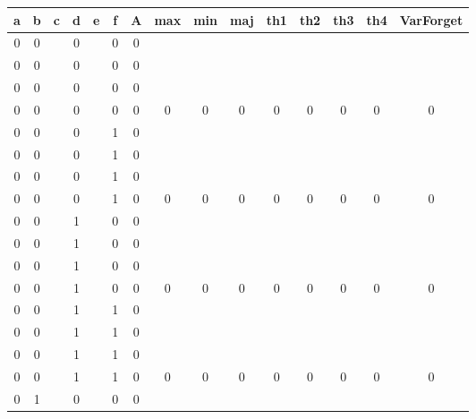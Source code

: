 \begin{table}[!tb]
    \centering
    \begin{tabular}{|c|c|c|c|c|c|c|c|c|c|c|c|c|c|c|}
        \hline
        \textbf{a} & \textbf{b} & \textbf{c} & \textbf{d} & \textbf{e} & \textbf{f} & \textbf{A} & \textbf{max} & \textbf{min} & \textbf{maj} & \textbf{th1} & \textbf{th2} & \textbf{th3} & \textbf{th4} & \textbf{VarForget} \\ \hline
        \rowcolor{gray!40} 0 & 0 &  & 0 &  & 0 & 0 &  &  &  &  &  &  &  &  \\ \hline
        \rowcolor{gray!40} 0 & 0 &  & 0 &  & 0 & 0 &  &  &  &  &  &  &  &  \\ \hline
        \rowcolor{gray!40} 0 & 0 &  & 0 &  & 0 & 0 &  &  &  &  &  &  &  &  \\ \hline
        \rowcolor{gray!40} 0 & 0 &  & 0 &  & 0 & 0 & 0 & 0 & 0 & 0 & 0 & 0 & 0 & 0 \\ \hline
        \rowcolor{blue!40} 0 & 0 &  & 0 &  & 1 & 0 &  &  &  &  &  &  &  &  \\ \hline
        \rowcolor{blue!40} 0 & 0 &  & 0 &  & 1 & 0 &  &  &  &  &  &  &  &  \\ \hline
        \rowcolor{blue!40} 0 & 0 &  & 0 &  & 1 & 0 &  &  &  &  &  &  &  &  \\ \hline
        \rowcolor{blue!40} 0 & 0 &  & 0 &  & 1 & 0 & 0 & 0 & 0 & 0 & 0 & 0 & 0 & 0 \\ \hline
        \rowcolor{red!40} 0 & 0 &  & 1 &  & 0 & 0 &  &  &  &  &  &  &  &  \\ \hline
        \rowcolor{red!40} 0 & 0 &  & 1 &  & 0 & 0 &  &  &  &  &  &  &  &  \\ \hline
        \rowcolor{red!40} 0 & 0 &  & 1 &  & 0 & 0 &  &  &  &  &  &  &  &  \\ \hline
        \rowcolor{red!40} 0 & 0 &  & 1 &  & 0 & 0 & 0 & 0 & 0 & 0 & 0 & 0 & 0 & 0 \\ \hline
        \rowcolor{green!40} 0 & 0 &  & 1 &  & 1 & 0 &  &  &  &  &  &  &  &  \\ \hline
        \rowcolor{green!40} 0 & 0 &  & 1 &  & 1 & 0 &  &  &  &  &  &  &  &  \\ \hline
        \rowcolor{green!40} 0 & 0 &  & 1 &  & 1 & 0 &  &  &  &  &  &  &  &  \\ \hline
        \rowcolor{green!40} 0 & 0 &  & 1 &  & 1 & 0 & 0 & 0 & 0 & 0 & 0 & 0 & 0 & 0 \\ \hline
        \rowcolor{yellow!40} 0 & 1 &  & 0 &  & 0 & 0 &  &  &  &  &  &  &  &  \\ \hline

\end{tabular}
\end{table}
